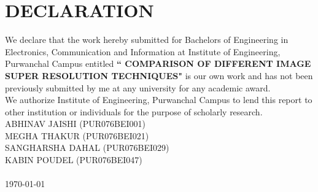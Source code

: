 \newpage
{}
\section*{DECLARATION}
We declare that the work hereby submitted for Bachelors of Engineering in Electronics, Communication and Information at Institute of Engineering, Purwanchal Campus entitled \textbf{`` COMPARISON OF DIFFERENT IMAGE SUPER RESOLUTION TECHNIQUES"} is our own work and has not been previously submitted by me at any university for any academic award.\\
We authorize Institute of Engineering, Purwanchal Campus to lend this report to other institution or individuals for the purpose of scholarly research.
\vspace{1cm}\\
ABHINAV JAISHI (PUR076BEI001)\\
MEGHA THAKUR (PUR076BEI021)\\
SANGHARSHA DAHAL (PUR076BEI029)\\
KABIN POUDEL (PUR076BEI047)\\
\\
\today